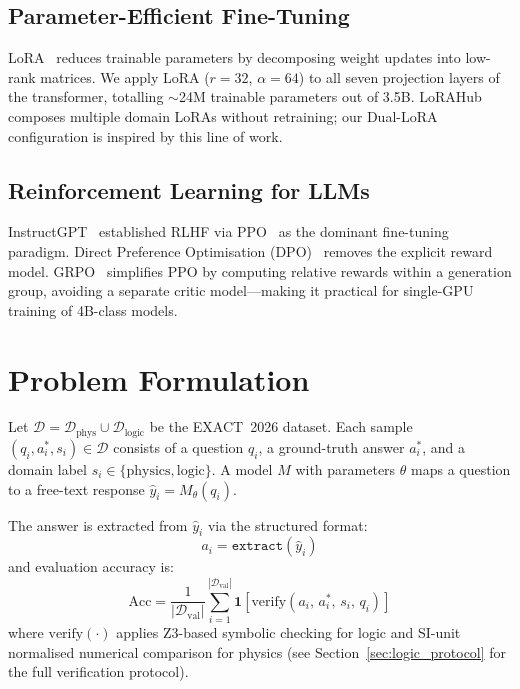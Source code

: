 \documentclass[cmc,journal,article,submit,moreauthors,pdftex]{Definitions/tsp}
\newcommand{\dataset}{EXACT~2026}
\begin{document}
\subsection{Parameter-Efficient Fine-Tuning}

LoRA~\cite{Hu2022} reduces trainable parameters by decomposing weight
updates into low-rank matrices.
We apply LoRA ($r=32$, $\alpha=64$) to all seven projection layers of
the transformer, totalling $\sim$24M trainable parameters out of 3.5B.
LoRAHub~\cite{Huang2023} composes multiple domain LoRAs without
retraining; our Dual-LoRA configuration is inspired by this line of work.

\subsection{Reinforcement Learning for LLMs}

InstructGPT~\cite{Ouyang2022} established RLHF via PPO~\cite{Schulman2017}
as the dominant fine-tuning paradigm.
Direct Preference Optimisation (DPO)~\cite{Rafailov2023} removes the
explicit reward model.
GRPO~\cite{Shao2024} simplifies PPO by computing relative rewards within
a generation group, avoiding a separate critic model---making it practical
for single-GPU training of 4B-class models.

\section{Problem Formulation}\label{sec:problem}

Let $\mathcal{D} = \mathcal{D}_{\text{phys}} \cup \mathcal{D}_{\text{logic}}$
be the \dataset{} dataset.
Each sample $(q_i, a_i^*, s_i) \in \mathcal{D}$ consists of a question
$q_i$, a ground-truth answer $a_i^*$, and a domain label
$s_i \in \{\text{physics}, \text{logic}\}$.
A model $M$ with parameters $\theta$ maps a question to a free-text
response $\hat{y}_i = M_\theta(q_i)$.

The answer is extracted from $\hat{y}_i$ via the structured format:
\begin{equation}
  a_i = \texttt{extract}(\hat{y}_i)
  \tag{1}
\end{equation}
and evaluation accuracy is:
\begin{equation}
  \mathrm{Acc} = \frac{1}{|\mathcal{D}_\text{val}|}
  \sum_{i=1}^{|\mathcal{D}_\text{val}|} \mathbf{1}\!\left[
    \mathrm{verify}(a_i,\, a_i^*,\, s_i,\, q_i)
  \right]
  \tag{2}
\end{equation}
where $\mathrm{verify}(\cdot)$ applies Z3-based symbolic checking for
logic and SI-unit normalised numerical comparison for physics
(see Section~\ref{sec:logic_protocol} for the full verification
protocol).
\end{document}
